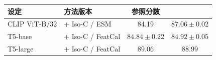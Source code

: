\begin{tabular}{@{}llcc@{}}
\toprule
设定 & 方法版本 & 参照分数 & \method{} \\
\midrule
CLIP ViT-B/32 & \method{} + Iso-C / ESM & 84.19 & $87.06\pm 0.02$ \\
T5-base & \method{} + Iso-C / FeatCal & $84.84\pm 0.22$ & $84.92\pm 0.05$ \\
T5-large & \method{} + Iso-C / FeatCal & $89.06$ & $88.99$ \\
\bottomrule
\end{tabular}
